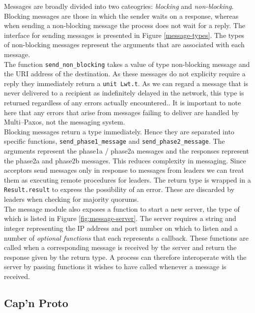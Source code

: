 Messages are broadly divided into two cateogries: \emph{blocking} and \emph{non-blocking}. Blocking messages are those in which the sender waits on a response, whereas when sending a non-blocking message the process does not wait for a reply. The interface for sending messages is presented in Figure \ref{message-types}. The types of non-blocking messages represent the arguments that are associated with each message. \\

The function \texttt{send\_non\_blocking} takes a value of type non-blocking message and the URI address of the destination. As these messages do not explicity require a reply they immediately return a \texttt{unit Lwt.t}. As we can regard a message that is never delivered to a recipient as indefinitely delayed in the network, this type is returned regardless of any errors actually encountered.. It is important to note here that any errors that arise from messages failing to deliver are handled by Multi--Paxos, not the messaging system. \\

Blocking messages return a type immediately. Hence they are separated into specific functions, \texttt{send\_phase1\_message} and \texttt{send\_phase2\_message}. The arguments represent the phase1a / phase2a messages and the responses represent the phase2a and phase2b messages. This reduces complexity in messaging. Since acceptors send messages only in response to messages from leaders we can treat them as executing remote procedures for leaders. The return type is wrapped in a \texttt{Result.result} to express the possibility of an error. These are discarded by leaders when checking for majority quorums. \\

The message module also exposes a function to start a new server, the type of which is listed in Figure \ref{fig:message-server}. The server requires a string and integer representing the IP address and port number on which to listen and a number of \emph{optional functions} that each represents a callback. These functions are called when a corresponding message is received by the server and return the response given by the return type. A process can therefore interoperate with the server by passing functions it wishes to have called whenever a message is received.

\subsection{Cap'n Proto}

